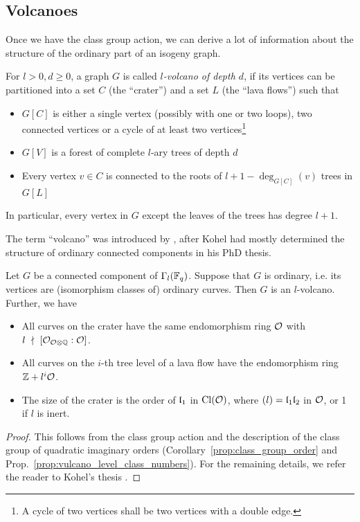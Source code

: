 \subsection{Volcanoes}
Once we have the class group action, we can derive a lot of information about the structure of the ordinary part of an isogeny graph.
\begin{definition}
    For $l > 0, d \geq 0$, a graph $G$ is called \emph{$l$-volcano of depth $d$}, if its vertices can be partitioned into a set $C$ (the ``crater'') and a set $L$ (the ``lava flows'') such that
    \begin{itemize}
        \item $G[C]$ is either a single vertex (possibly with one or two loops), two connected vertices or a cycle of at least two vertices\footnote{A cycle of two vertices shall be two vertices with a double edge.}
        \item $G[V]$ is a forest of complete $l$-ary trees of depth $d$
        \item Every vertex $v \in C$ is connected to the roots of $l + 1 - \deg_{G[C]}(v)$ trees in $G[L]$
    \end{itemize}
    In particular, every vertex in $G$ except the leaves of the trees has degree $l + 1$.
\end{definition}
The term ``volcano'' was introduced by \cite{isogeny_vulcano}, after Kohel had mostly determined the structure of ordinary connected components in his PhD thesis.
\begin{theorem}
    \label{prop:isogeny_vulcano}
    Let $G$ be a connected component of $\Gamma_l(\mathbb{F}_q)$.
    Suppose that $G$ is ordinary, i.e. its vertices are (isomorphism classes of) ordinary curves.
    Then $G$ is an $l$-volcano.
    Further, we have
    \begin{itemize}
        \item All curves on the crater have the same endomorphism ring $\mathcal{O}$ with $l \ \nmid \  [\mathcal{O}_{\mathcal{O} \otimes \mathbb{Q}} : \mathcal{O}]$.
        \item All curves on the $i$-th tree level of a lava flow have the endomorphism ring $\mathbb{Z} + l^i\mathcal{O}$.
        \item The size of the crater is the order of $\mathfrak{l}_1$ in $\mathrm{Cl}(\mathcal{O})$, where $(l) = \mathfrak{l}_1\mathfrak{l}_2$ in $\mathcal{O}$, or 1 if $l$ is inert.
    \end{itemize} 
\end{theorem}
\begin{proof}
    This follows from the class group action and the description of the class group of quadratic imaginary orders (Corollary~\ref{prop:class_group_order} and Prop.~\ref{prop:vulcano_level_class_numbers}).
    For the remaining details, we refer the reader to Kohel's thesis \cite[Prop.~23]{kohel}.
\end{proof}
